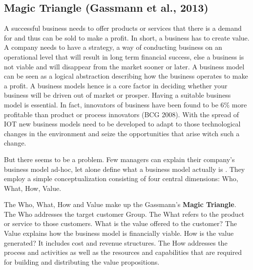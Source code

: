 	\subsection{Magic Triangle (Gassmann et al., 2013)}
		A successful business needs to offer products or services that there is a demand for and thus can be sold to make a profit. In short, a business has to create value. A company needs to have a strategy, a way of conducting business on an operational level that will result in long term financial success, else a business is not viable and will disappear from the market sooner or later.
		A business model can be seen as a logical abstraction describing how the business operates to make a profit. A business models hence is a core factor in deciding whether your business will be driven out of market or prosper. Having a suitable business model is essential. In fact, innovators of business have been found to be 6\% more profitable than product or process innovators (BCG 2008). With the spread of IOT new business models need to be developed to adapt to those technological changes in the environment and seize the opportunities that arise witch such a change. 

		But there seems to be a problem. Few managers can explain their company's business model ad-hoc, let alone define what a business model actually is \cite{gassmann}. They employ a simple conceptualization consisting of four central dimensions: Who, What, How, Value. 

		The Who, What, How and Value make up the Gassmann's \textbf{Magic Triangle}. The Who addresses the target customer Group. The What refers to the product or service to those customers. What is the value offered to the customer? The Value explains how the business model is financially viable. How is the value generated? It includes cost and revenue structures. The How addresses the process and activities as well as the resources and capabilities that are required for building and distributing the value propositions.		
					
